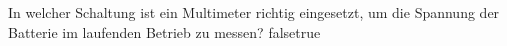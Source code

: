     {In welcher Schaltung ist ein Multimeter richtig eingesetzt, um die Spannung der Batterie im laufenden Betrieb zu messen?}
    {}
    {}
    {}
    {}
    {false}{true}